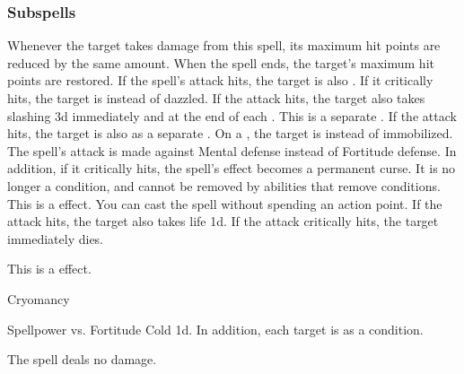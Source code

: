 \subsubsection{Subspells}
Whenever the target takes damage from this spell, its maximum hit points are reduced by the same amount.
When the spell ends, the target's maximum hit points are restored.
If the spell's attack hits, the target is also \dazzled. If it critically hits, the target is \blinded instead of dazzled.
If the attack hits, the target also takes slashing  \minus3d immediately and at the end of each .
This is a separate .
If the attack hits, the target is also  as a separate .
On a , the target is  instead of immobilized.
The spell's attack is made against Mental defense instead of Fortitude defense.
In addition, if it critically hits, the spell's effect becomes a permanent curse.
It is no longer a condition, and cannot be removed by abilities that remove conditions.
This is a  effect.
You can cast the spell without spending an action point.
If the attack hits, the target also takes life  \plus1d.
If the attack critically hits, the target immediately dies.
\par
This is a  effect.
\begin{spellsection}{Cryomancy}
\begin{spellheader}
\end{spellheader}
\begin{spellcontent}
\begin{spelltargetinginfo}
\end{spelltargetinginfo}
\begin{spelleffects}
\begin{spellattack}{Spellpower vs. Fortitude}
\spellsuccess
Cold  \minus1d.
In addition, each target is \fatigued as a condition.
\end{spellattack}
\end{spelleffects}
\end{spellcontent}
\begin{spellfooter}
\end{spellfooter}
\begin{spellsubcontent}
\begin{spellcantrip}
The spell deals no damage.
\end{spellcantrip}
\end{spellsubcontent}
\end{spellsection}
